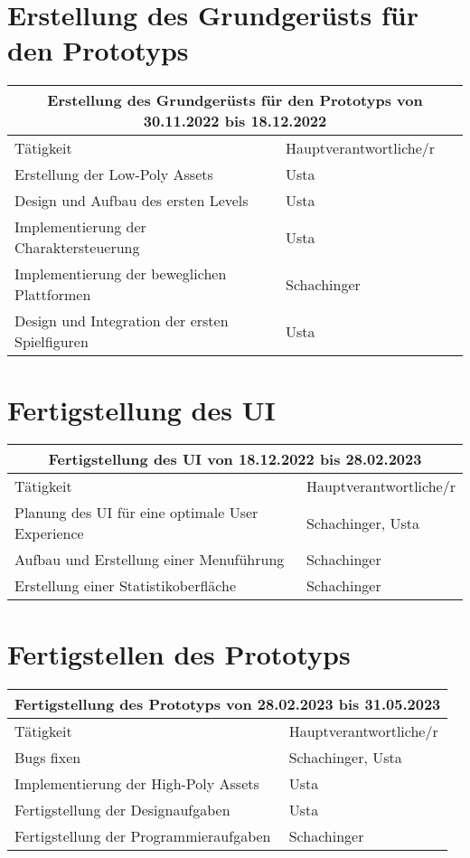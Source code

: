 \section{Erstellung des Grundgerüsts für den Prototyps}
\begin{tabular}{|m{}|m{}|}
\hline
\multicolumn{2}{|c|}{\textbf{Erstellung des Grundgerüsts für den Prototyps von 30.11.2022 bis 18.12.2022}} \\
\hline
Tätigkeit & Hauptverantwortliche/r \\
\hline
Erstellung der Low-Poly Assets & Usta \\
\hline
Design und Aufbau des ersten Levels & Usta \\
\hline
Implementierung der Charaktersteuerung & Usta \\
\hline
Implementierung der beweglichen Plattformen & Schachinger \\
\hline
Design und Integration der ersten Spielfiguren & Usta \\
\hline
\end{tabular}

\section{Fertigstellung des UI}
\begin{tabular}{|m{}|m{}|}
\hline
\multicolumn{2}{|c|}{\textbf{Fertigstellung des UI von 18.12.2022 bis 28.02.2023}} \\
\hline
Tätigkeit & Hauptverantwortliche/r \\
\hline
Planung des UI für eine optimale User Experience & Schachinger, Usta \\
\hline
Aufbau und Erstellung einer Menuführung & Schachinger \\
\hline
Erstellung einer Statistikoberfläche & Schachinger \\
\hline
\end{tabular}

\section{Fertigstellen des Prototyps}
\begin{tabular}{|m{}|m{}|}
\hline
\multicolumn{2}{|c|}{\textbf{Fertigstellung des Prototyps von 28.02.2023 bis 31.05.2023}} \\
\hline
Tätigkeit & Hauptverantwortliche/r \\
\hline
Bugs fixen & Schachinger, Usta \\
\hline
Implementierung der High-Poly Assets & Usta \\
\hline
Fertigstellung der Designaufgaben & Usta \\
\hline
Fertigstellung der Programmieraufgaben & Schachinger \\
\hline
\end{tabular}

